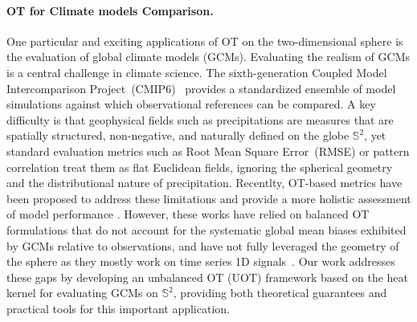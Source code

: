 \documentclass{article}
\theoremstyle{plain}
\theoremstyle{definition}
\theoremstyle{remark}
\renewcommand{\S}{\ensuremath{\mathbb{S}}}
\begin{document}
\paragraph{OT for Climate models Comparison.} One particular and exciting applications of OT on the two-dimensional sphere is the evaluation of global climate models (GCMs). Evaluating the realism of GCMs is a central
challenge in climate science. The sixth-generation Coupled Model
Intercomparison Project~(CMIP6)~\cite{eyring2016overview} provides
a standardized ensemble of model simulations against which
observational references can be compared. A key difficulty is that
geophysical fields such as precipitations are measures that are
spatially structured, non-negative, and naturally defined on the
globe $\mathbb{S}^2$, yet standard evaluation metrics such as
Root Mean Square Error~(RMSE) or pattern correlation treat them as
flat Euclidean fields, ignoring the spherical geometry and the
distributional nature of precipitation. Recentlty, OT-based metrics have been proposed to address these limitations and provide a more holistic assessment of model performance \cite{Vissio2020evaluating,garrett2024validating,Rodrigues2025climate,Xie2025discovering}. However, these works have relied on balanced OT formulations that do not account for the systematic global mean biases exhibited by GCMs relative to observations, and have not fully leveraged the geometry of the sphere as they mostly work on time series 1D signals~\cite{garrett2024validating,Xie2025discovering}. Our work addresses these gaps by developing an unbalanced OT (UOT) framework based on the heat kernel for evaluating GCMs on $\S^2$, providing both theoretical guarantees and practical tools for this important application.
\end{document}
